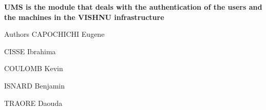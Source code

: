 \begin{center}{\bfseries UMS is the module that deals with the authentication of the users and the machines in the VISHNU infrastructure}\end{center} 



\begin{DoxyAuthor}{Authors}
CAPOCHICHI Eugene 

CISSE Ibrahima 

COULOMB Kevin 

ISNARD Benjamin 

TRAORE Daouda 
\end{DoxyAuthor}
